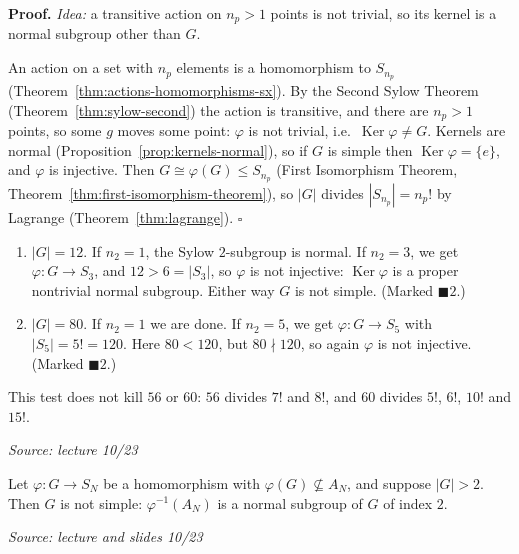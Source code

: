 \documentclass[11pt]{report}
\renewenvironment{proof}[1][Proof]{\noindent\textbf{#1.} }{\hfill$\square$\par\vspace{5pt}}
\newcommand{\srcline}[1]{\par\hfill{\footnotesize\textit{Source: #1}}}
\begin{document}
\begin{proof}
\textit{Idea:} a transitive action on $n_p > 1$ points is not trivial, so its kernel is a normal subgroup other than $G$.\par
An action on a set with $n_p$ elements is a homomorphism to $S_{n_p}$ (Theorem~\ref{thm:actions-homomorphisms-sx}). By the Second Sylow Theorem (Theorem~\ref{thm:sylow-second}) the action is transitive, and there are $n_p > 1$ points, so some $g$ moves some point: $\varphi$ is not trivial, i.e.\ $\operatorname{Ker}\varphi \neq G$. Kernels are normal (Proposition~\ref{prop:kernels-normal}), so if $G$ is simple then $\operatorname{Ker}\varphi = \{e\}$, and $\varphi$ is injective. Then $G \cong \varphi(G) \leq S_{n_p}$ (First Isomorphism Theorem, Theorem~\ref{thm:first-isomorphism-theorem}), so $|G|$ divides $|S_{n_p}| = n_p!$ by Lagrange (Theorem~\ref{thm:lagrange}).
\end{proof}

\begin{exbox}\label{ex:orders-12-80}
\begin{enumerate}
    \item $|G| = 12$. If $n_2 = 1$, the Sylow $2$-subgroup is normal. If $n_2 = 3$, we get $\varphi: G \to S_3$, and $12 > 6 = |S_3|$, so $\varphi$ is not injective: $\operatorname{Ker}\varphi$ is a proper nontrivial normal subgroup. Either way $G$ is not simple. (Marked $\blacksquare 2$.)
    \item $|G| = 80$. If $n_2 = 1$ we are done. If $n_2 = 5$, we get $\varphi: G \to S_5$ with $|S_5| = 5! = 120$. Here $80 < 120$, but $80 \nmid 120$, so again $\varphi$ is not injective. (Marked $\blacksquare 2$.)
\end{enumerate}
This test does not kill $56$ or $60$: $56$ divides $7!$ and $8!$, and $60$ divides $5!$, $6!$, $10!$ and $15!$.
\srcline{lecture 10/23}
\end{exbox}

\begin{lembox}\label{lem:leave-an}
Let $\varphi: G \to S_N$ be a homomorphism with $\varphi(G) \not\subseteq A_N$, and suppose $|G| > 2$. Then $G$ is not simple: $\varphi^{-1}(A_N)$ is a normal subgroup of $G$ of index $2$.
\srcline{lecture and slides 10/23}
\end{lembox}
\end{document}
